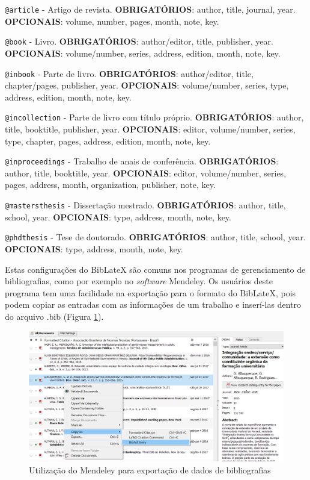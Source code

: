 \documentclass[12pt,brazil,oneside]{book}
\begin{document}
\texttt{@article} - Artigo de revista. \textbf{OBRIGATÓRIOS}: author,
title, journal, year. \textbf{OPCIONAIS}: volume, number, pages, month,
note, key.

\texttt{@book} - Livro. \textbf{OBRIGATÓRIOS}: author/editor, title,
publisher, year. \textbf{OPCIONAIS}: volume/number, series, address,
edition, month, note, key.

\texttt{@inbook} - Parte de livro. \textbf{OBRIGATÓRIOS}: author/editor,
title, chapter/pages, publisher, year. \textbf{OPCIONAIS}:
volume/number, series, type, address, edition, month, note, key.

\texttt{@incollection} - Parte de livro com título próprio.
\textbf{OBRIGATÓRIOS}: author, title, booktitle, publisher, year.
\textbf{OPCIONAIS}: editor, volume/number, series, type, chapter, pages,
address, edition, month, note, key.

\texttt{@inproceedings} - Trabalho de anais de conferência.
\textbf{OBRIGATÓRIOS}: author, title, booktitle, year.
\textbf{OPCIONAIS}: editor, volume/number, series, pages, address,
month, organization, publisher, note, key.

\texttt{@mastersthesis} - Dissertação mestrado. \textbf{OBRIGATÓRIOS}:
author, title, school, year. \textbf{OPCIONAIS}: type, address, month,
note, key.

\texttt{@phdthesis} - Tese de doutorado. \textbf{OBRIGATÓRIOS}: author,
title, school, year. \textbf{OPCIONAIS}: type, address, month, note,
key.

Estas configurações do BibLateX são comuns nos programas de
gerenciamento de bibliografias, como por exemplo no \emph{software}
Mendeley. Os usuários deste programa tem uma facilidade na exportação
para o formato do BibLateX, pois podem copiar as entradas com as
informações de um trabalho e inserí-las dentro do arquivo .bib (Figura
\ref{fig:rmarkmendeley}).

\begin{figure}[H]

{\centering \includegraphics[width=0.6\linewidth]{rmarkmendeley} 

}

\caption{Utilização do Mendeley para exportação de dados de bibliografias}\label{fig:rmarkmendeley}
\end{figure}
\end{document}
